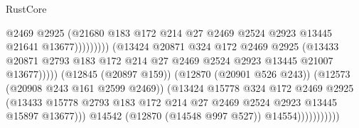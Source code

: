 \begin{lexlean}{RustCore}
\begin{coremodule}
                                                  @2469
                                                  @2925
                                                  (@21680
                                                    @183
                                                    @172
                                                    @214
                                                    @27
                                                    @2469
                                                    @2524
                                                    @2923
                                                    @13445
                                                    @21641
                                                    @13677)))))))))
                                  (@13424
                                    @20871
                                    @324
                                    @172
                                    @2469
                                    @2925
                                    (@13433
                                      @20871
                                      @2793
                                      @183
                                      @172
                                      @214
                                      @27
                                      @2469
                                      @2524
                                      @2923
                                      @13445
                                      @21007
                                      @13677)))))
                            (@12845 (@20897 @159))
                            (@12870 (@20901 @526 @243))
                            (@12573 (@20908 @243 @161 @2599 @2469))
                            (@13424
                              @15778
                              @324
                              @172
                              @2469
                              @2925
                              (@13433
                                @15778
                                @2793
                                @183
                                @172
                                @214
                                @27
                                @2469
                                @2524
                                @2923
                                @13445
                                @15897
                                @13677)))
                          @14542
                          (@12870 (@14548 @997 @527))
                          @14554)))))))))))

\end{coremodule}
\end{lexlean}

